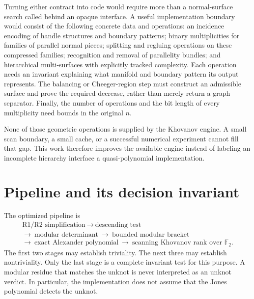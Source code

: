 \documentclass[11pt]{article}
\theoremstyle{remark}\newtheorem{remark}[theorem]{Remark}
\newcommand{\F}{\mathbb F}
\begin{document}
Turning either contract into code would require more than a normal-surface
search called behind an opaque interface. A useful implementation boundary
would consist of the following concrete data and operations: an incidence
encoding of handle structures and boundary patterns; binary multiplicities
for families of parallel normal pieces; splitting and regluing operations on
these compressed families; recognition and removal of parallelity bundles;
and hierarchical multi-surfaces with explicitly tracked complexity. Each
operation needs an invariant explaining what manifold and boundary pattern
its output represents. The balancing or Cheeger-region step must construct
an admissible surface and prove the required decrease, rather than merely
return a graph separator. Finally, the number of operations and the bit
length of every multiplicity need bounds in the original $n$.

None of those geometric operations is supplied by the Khovanov engine.
A small scan boundary, a small cache, or a successful numerical experiment
cannot fill that gap. This work therefore improves the available engine
instead of labeling an incomplete hierarchy interface a quasi-polynomial
implementation.

\section{Pipeline and its decision invariant}

The optimized pipeline is
\[
 \begin{gathered}
 \text{R1/R2 simplification}\ \longrightarrow\ \text{descending test}\\
 \longrightarrow\ \text{modular determinant}\ \longrightarrow\
 \text{bounded modular bracket}\\
 \longrightarrow\ \text{exact Alexander polynomial}\ \longrightarrow\
 \text{scanning Khovanov rank over }\F_2.
 \end{gathered}
\]
The first two stages may establish triviality. The next three may establish
nontriviality. Only the last stage is a complete invariant test for this
purpose. A modular residue that matches the unknot is never interpreted as
an unknot verdict. In particular, the implementation does not assume that
the Jones polynomial detects the unknot.
\end{document}
